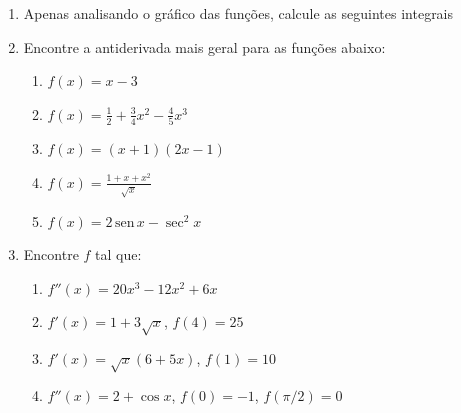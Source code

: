 \documentclass[a4paper,5pt]{amsbook}
\newcommand{\sen}{\,\mbox{sen}\,}
\newcommand{\ds}{\displaystyle}
\begin{document}
\begin{enumerate}
    \vspace{0.5cm}
    \item Apenas analisando o gr\'afico das fun\c{c}\~oes, calcule as seguintes integrais

    \vspace{0.5cm}
    \item Encontre a antiderivada mais geral para as fun\c{c}\~oes abaixo:
        \begin{enumerate}
            \item $f(x)=x-3$
            \item $f(x)=\ds\frac{1}{2}+\frac{3}{4}x^2-\frac{4}{5}x^3$
            \item $f(x)=(x+1)(2x-1)$
            \item $f(x)=\ds\frac{1+x+x^2}{\sqrt{x}}$
            \item $f(x)=2\sen{x}-\sec^2{x}$
        \end{enumerate}

    \vspace{0.5cm}
    \item Encontre $f$ tal que:
        \begin{enumerate}
            \item $f''(x)=20x^3-12x^2+6x$
            \item $f'(x)=1+3\sqrt{x}$, $f(4)=25$
            \item $f'(x)=\sqrt{x}(6+5x)$, $f(1)=10$
            \item $f''(x)=2+\cos{x}$, $f(0)=-1$, $f(\pi/2)=0$
        \end{enumerate}


\end{enumerate}
\end{document}
